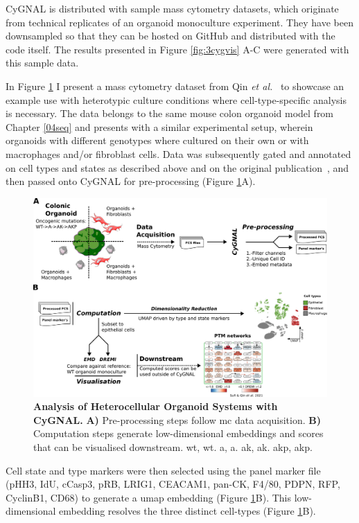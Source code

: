 CyGNAL is distributed with sample mass cytometry datasets, which originate from technical replicates of an organoid monoculture experiment. They have been downsampled so that they can be hosted on GitHub and distributed with the code itself. The results presented in Figure \ref{fig:3cygvis} A-C were generated with this sample data.

In Figure \ref{fig:3cyguse} I present a mass cytometry dataset from Qin \emph{et al.}~\cite{qin_cell-type-specific_2020} to showcase an example use with heterotypic culture conditions where cell-type-specific analysis is necessary. The data belongs to the same mouse colon organoid model from Chapter \ref{04seq} and presents with a similar experimental setup, wherein organoids with different genotypes where cultured on their own or with macrophages and/or fibroblast cells. Data was subsequently gated and annotated on cell types and states as described above and on the original publication~\cite{qin_cell-type-specific_2020}, and then passed onto CyGNAL for pre-processing (Figure \ref{fig:3cyguse}A).

\begin{figure}
    \centering
    \includegraphics{03cytof/figs/3CYGNAL_usage.png}
    \caption{\textbf{Analysis of Heterocellular Organoid Systems with CyGNAL.} \textbf{A)} Pre-processing steps follow \acrshort{mc} data acquisition. \textbf{B)} Computation steps generate low-dimensional embeddings and scores that can be visualised downstream. \acrshort{wt}, \acrlong{wt}. \acrshort{a}, \acrlong{a}. \acrshort{ak}, \acrlong{ak}. \acrshort{akp}, \acrlong{akp}.}
    \label{fig:3cyguse}
\end{figure}

Cell state and type markers were then selected using the panel marker file (pHH3, IdU, cCasp3, pRB, LRIG1, CEACAM1, pan-CK, F4/80, PDPN, RFP, CyclinB1, CD68) to generate a \acrshort{umap} embedding (Figure \ref{fig:3cyguse}B). This low-dimensional embedding resolves the three distinct cell-types (Figure \ref{fig:3cyguse}B).

